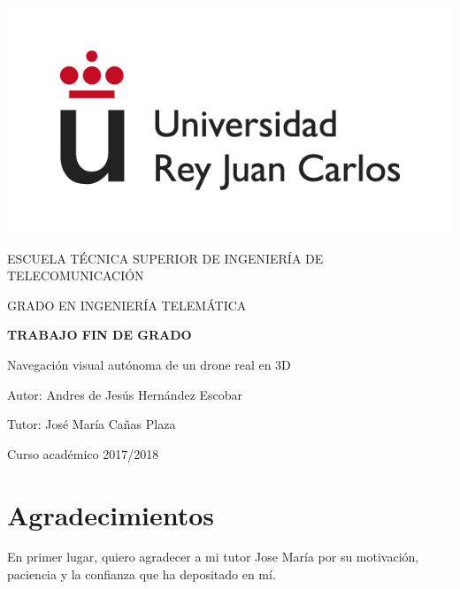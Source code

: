 \documentclass[a4paper, 12pt, oneside]{book}
\begin{document}
\begin{titlepage}
	\begin{center}
		\vspace*{1mm}
		\begin{center}
			\includegraphics[width=0.8\linewidth]{imag/logo.jpg}
		\end{center}
		\vspace{6.5mm}
		
		\fontsize{15.5}{14}\selectfont ESCUELA TÉCNICA SUPERIOR DE INGENIERÍA DE TELECOMUNICACIÓN
		\vspace{8mm}
		
		\fontsize{14}{14}\selectfont GRADO EN INGENIERÍA TELEMÁTICA
		
		\vspace{60pt}
		
		\fontsize{15.7}{14}\selectfont \textbf{TRABAJO FIN DE GRADO} 
		
		\vspace{15mm}
		\begin{huge}
			Navegación visual autónoma de un drone real en 3D
		\end{huge}
		
		\vspace{15mm}
		
		\begin{large}
			Autor: Andres de Jesús Hernández Escobar
			
			Tutor: José María Cañas Plaza
			
			\vspace{7mm}
		\end{large}
		\begin{normalsize}
			Curso académico 2017/2018		
		\end{normalsize}
	\end{center}
\end{titlepage}

\thispagestyle{empty}
\afterpage{\null\newpage}
\newpage

\chapter*{Agradecimientos}
En primer lugar, quiero agradecer a mi tutor Jose María por su motivación, paciencia y la confianza que ha depositado en mí.
\end{document}
